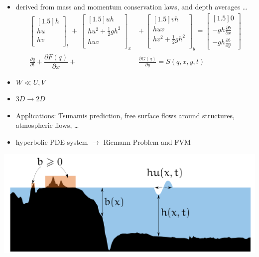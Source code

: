 \begin{frame}
    
\begin{multicols}{2}
    \begin{itemize}
\item derived from mass and momentum conservation laws, and depth averages \dots %
\begin{align*}
\begin{bmatrix}[1.5]
h\\
hu\\
hv\\
\end{bmatrix}_t \ + \ 
\begin{bmatrix}[1.5]
uh\\
hu^2 + \frac{1}{2}gh^2\\
huv\\
\end{bmatrix}_x\ &+ \ 
\begin{bmatrix}[1.5]
vh\\
huv\\
hv^2 + \frac{1}{2}gh^2\\
\end{bmatrix}_y = 
\begin{bmatrix}[1.5]
0\\
-gh\frac{\partial b}{\partial x}\\
-gh\frac{\partial b}{\partial y}
\end{bmatrix}\\[0.75cm]
\frac{\partial q}{\partial t} + \dfrac{\partial F(q)}{\partial x} + &\frac{\partial G(q)}{\partial y} = S(q,x,y,t) 
\end{align*}
\vspace{0.25cm}
\item $ W \ll U,V $
\item $3D\rightarrow 2D$ 
\item Applications: {\small Tsunamis prediction, free surface flows around structures, atmospheric flows, \dots} \\[0.35cm]
\item hyperbolic PDE system $\rightarrow$ Riemann Problem and FVM
\end{itemize}
    \vfill\columnbreak
    \vspace*{0.39cm}
    \includegraphics[width=\columnwidth, height=.3\textheight]{./Resources/Images/swe.png}%
\end{multicols}
\end{frame}
\clearpage

